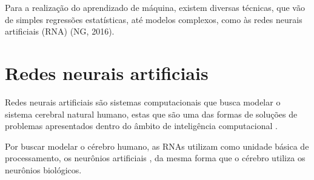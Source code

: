Para a realização do aprendizado de máquina, existem diversas técnicas, que vão de simples regressões estatísticas, até modelos complexos, como às redes neurais artificiais (RNA) (NG, 2016).

\section{Redes neurais artificiais}


Redes neurais artificiais são sistemas computacionais que busca modelar o sistema cerebral natural humano, estas que são uma das formas de soluções de problemas apresentados dentro do âmbito de inteligência computacional \cite{Cintra2019}.

Por buscar modelar o cérebro humano, as RNAs utilizam como unidade básica de processamento, os neurônios artificiais \cite{Haykin2001}, da mesma forma que o cérebro utiliza os neurônios biológicos. %



